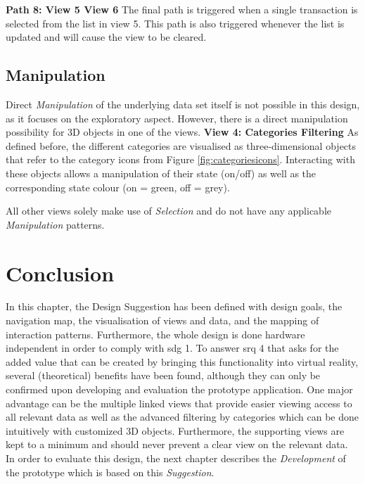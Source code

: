 \textbf{Path 8: View 5 \textrightarrow View 6} \newline
The final path is triggered when a single transaction is selected from the list in view 5. This path is also triggered whenever the list is updated and will cause the view to be cleared.




\subsection{Manipulation}

Direct \textit{Manipulation} of the underlying data set itself is not possible in this design, as it focuses on the exploratory aspect. However, there is a direct manipulation possibility for 3D objects in one of the views.
\textbf{View 4: Categories Filtering} \newline
As defined before, the different categories are visualised as three-dimensional objects that refer to the category icons from Figure \ref{fig:categoriesicons}. Interacting with these objects allows a manipulation of their state (on/off) as well as the corresponding state colour (on = green, off = grey).

All other views solely make use of \textit{Selection} and do not have any applicable \textit{Manipulation} patterns.



\section{Conclusion}

In this chapter, the Design Suggestion has been defined with design goals, the navigation map, the visualisation of views and data, and the mapping of interaction patterns. Furthermore, the whole design is done hardware independent in order to comply with \gls{sdg} 1. To answer \gls{srq} 4 that asks for the added value that can be created by bringing this functionality into virtual reality, several (theoretical) benefits have been found, although they can only be confirmed upon developing and evaluation the prototype application. One major advantage can be the multiple linked views that provide easier viewing access to all relevant data as well as the advanced filtering by categories which can be done intuitively with customized 3D objects. Furthermore, the supporting views are kept to a minimum and should never prevent a clear view on the relevant data. \newline
In order to evaluate this design, the next chapter describes the \textit{Development} of the prototype which is based on this \textit{Suggestion}.
